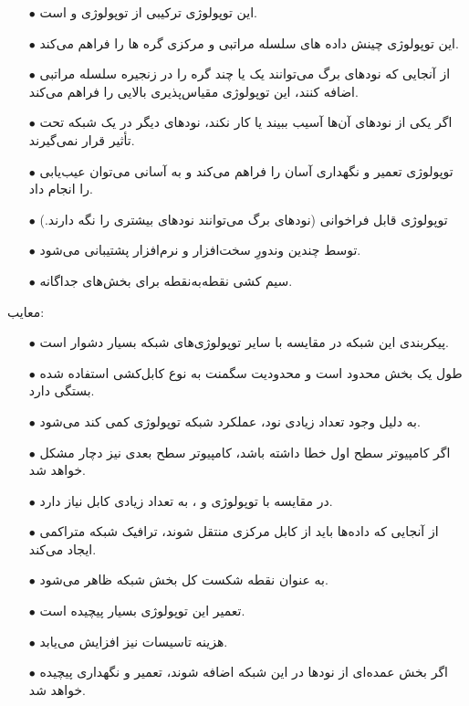 \documentclass{article}
\begin{document}
\begin{itemize}
\item [$\bullet$] این توپولوژی ترکیبی از توپولوژی  و  است.
\item [$\bullet$] این توپولوژی چینش داده های سلسله مراتبی و مرکزی گره ها را فراهم می‌کند.
\item [$\bullet$] از آنجایی که نودهای برگ می‌توانند یک یا چند گره را در زنجیره سلسله مراتبی اضافه کنند، این توپولوژی مقیاس‌پذیری بالایی را فراهم می‌کند.
\item [$\bullet$] اگر یکی از نودهای آن‌ها آسیب ببیند یا کار نکند، نودهای دیگر در یک شبکه تحت تأثیر قرار نمی‌گیرند.
\item [$\bullet$] توپولوژی  تعمیر و نگهداری آسان را فراهم می‌کند و به آسانی می‌توان عیب‌یابی را انجام داد.
\item [$\bullet$] توپولوژی قابل فراخوانی (نودهای برگ می‌توانند نودهای بیشتری را نگه دارند.)
\item [$\bullet$] توسط چندین وندورِ سخت‌افزار و نرم‌افزار پشتیبانی می‌شود.
\item [$\bullet$] سیم کشی نقطه‌به‌نقطه برای بخش‌های جداگانه.
\end{itemize}
معایب:
\begin{itemize}
\item [$\bullet$] پیکربندی این شبکه در مقایسه با سایر توپولوژی‌های شبکه بسیار دشوار است.
\item [$\bullet$] طول یک بخش محدود است و محدودیت سگمنت به نوع کابل‌کشی استفاده شده بستگی دارد.
\item [$\bullet$] به دلیل وجود تعداد زیادی نود، عملکرد شبکه توپولوژی  کمی کند می‌شود.
\item [$\bullet$] اگر کامپیوتر سطح اول خطا داشته باشد، کامپیوتر سطح بعدی نیز دچار مشکل خواهد شد.
\item [$\bullet$] در مقایسه با توپولوژی  و ، به تعداد زیادی کابل نیاز دارد.
\item [$\bullet$] از آنجایی که داده‌ها باید از کابل مرکزی منتقل شوند، ترافیک شبکه متراکمی ایجاد می‌کند.
\item [$\bullet$]  به عنوان نقطه شکست کل بخش شبکه ظاهر می‌شود.
\item [$\bullet$] تعمیر این توپولوژی بسیار پیچیده است.
\item [$\bullet$] هزینه تاسیسات نیز افزایش می‌یابد.
\item [$\bullet$] اگر بخش عمده‌ای از نودها در این شبکه اضافه شوند، تعمیر و نگهداری پیچیده خواهد شد.

\end{itemize}
\end{document}
